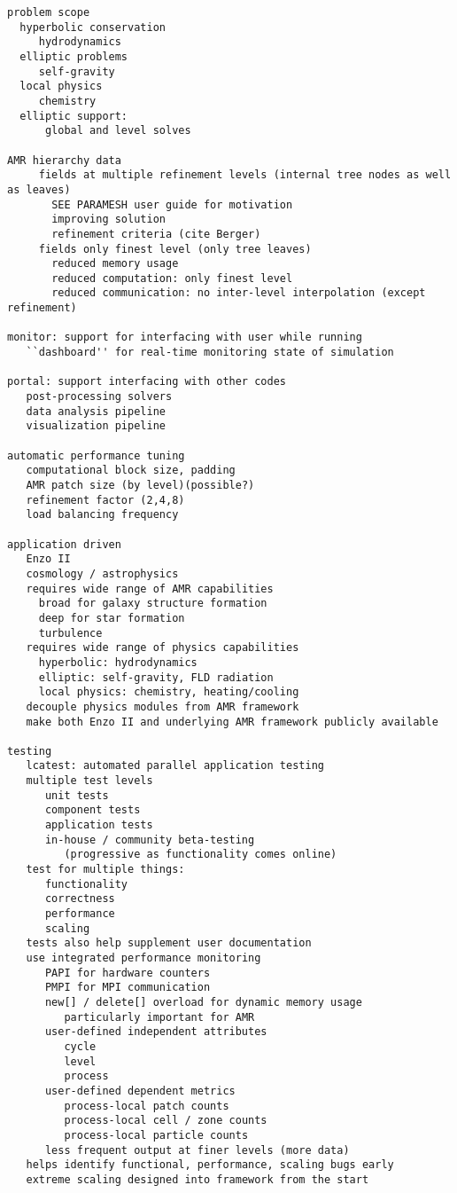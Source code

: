 \documentclass[14pt,letter]{article}
\begin{document}
\begin{verbatim}
problem scope
  hyperbolic conservation
     hydrodynamics
  elliptic problems
     self-gravity
  local physics
     chemistry
  elliptic support:
      global and level solves

AMR hierarchy data
     fields at multiple refinement levels (internal tree nodes as well as leaves)
       SEE PARAMESH user guide for motivation
       improving solution
       refinement criteria (cite Berger)
     fields only finest level (only tree leaves)
       reduced memory usage
       reduced computation: only finest level
       reduced communication: no inter-level interpolation (except refinement)

monitor: support for interfacing with user while running
   ``dashboard'' for real-time monitoring state of simulation
   
portal: support interfacing with other codes
   post-processing solvers
   data analysis pipeline
   visualization pipeline

automatic performance tuning
   computational block size, padding
   AMR patch size (by level)(possible?)
   refinement factor (2,4,8)
   load balancing frequency

application driven
   Enzo II
   cosmology / astrophysics
   requires wide range of AMR capabilities
     broad for galaxy structure formation
     deep for star formation
     turbulence
   requires wide range of physics capabilities
     hyperbolic: hydrodynamics
     elliptic: self-gravity, FLD radiation
     local physics: chemistry, heating/cooling
   decouple physics modules from AMR framework
   make both Enzo II and underlying AMR framework publicly available

testing
   lcatest: automated parallel application testing
   multiple test levels
      unit tests
      component tests
      application tests
      in-house / community beta-testing
         (progressive as functionality comes online)
   test for multiple things:
      functionality
      correctness
      performance
      scaling
   tests also help supplement user documentation
   use integrated performance monitoring
      PAPI for hardware counters
      PMPI for MPI communication
      new[] / delete[] overload for dynamic memory usage
         particularly important for AMR
      user-defined independent attributes
         cycle
         level
         process
      user-defined dependent metrics
         process-local patch counts
         process-local cell / zone counts
         process-local particle counts
      less frequent output at finer levels (more data)
   helps identify functional, performance, scaling bugs early
   extreme scaling designed into framework from the start


\end{verbatim}
\end{document}
